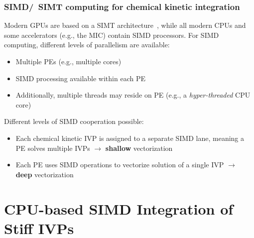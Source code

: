 \documentclass{beamer}
\begin{document}
\begin{frame}
 \frametitle{SIMD\slash~SIMT computing for chemical kinetic integration}
 Modern GPUs are based on a SIMT architecture~, while all modern CPUs and some accelerators (e.g., the MIC) contain SIMD processors.
 For SIMD computing, different levels of parallelism are available:
 \begin{itemize}
  \item Multiple PEs (e.g., multiple cores)
  \item SIMD processing available within each PE
  \item Additionally, multiple threads may reside on PE (e.g., a \textit{hyper-threaded} CPU core)
 \end{itemize}
 Different levels of SIMD cooperation possible:
 \begin{itemize}
  \item Each chemical kinetic IVP is assigned to a separate SIMD lane, meaning a PE solves multiple IVPs $\rightarrow$ \textbf{shallow} vectorization
  \item Each PE uses SIMD operations to vectorize solution of a single IVP $\rightarrow$ \textbf{deep} vectorization
 \end{itemize}
\end{frame}

\section{CPU-based SIMD Integration of Stiff IVPs}
\end{document}
